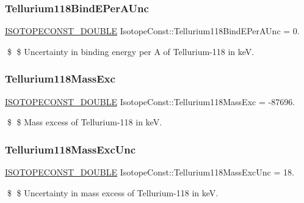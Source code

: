 \subsubsection{\texorpdfstring{Tellurium118\+Bind\+E\+Per\+A\+Unc}{Tellurium118BindEPerAUnc}}
{\footnotesize\ttfamily \mbox{\hyperlink{group___isotope_const-_macros_ga8f45a7272ce02c0b4c65c44636ed719a}{I\+S\+O\+T\+O\+P\+E\+C\+O\+N\+S\+T\+\_\+\+D\+O\+U\+B\+LE}} Isotope\+Const\+::\+Tellurium118\+Bind\+E\+Per\+A\+Unc = 0.}

\$ \$ Uncertainty in binding energy per A of Tellurium-\/118 in keV. \mbox{\label{group___isotope_const-_tellurium-_te118_gae98be884b7b64e0adf6f7be1048c6916}} 
\subsubsection{\texorpdfstring{Tellurium118\+Mass\+Exc}{Tellurium118MassExc}}
{\footnotesize\ttfamily \mbox{\hyperlink{group___isotope_const-_macros_ga8f45a7272ce02c0b4c65c44636ed719a}{I\+S\+O\+T\+O\+P\+E\+C\+O\+N\+S\+T\+\_\+\+D\+O\+U\+B\+LE}} Isotope\+Const\+::\+Tellurium118\+Mass\+Exc = -\/87696.}

\$ \$ Mass excess of Tellurium-\/118 in keV. \mbox{\label{group___isotope_const-_tellurium-_te118_ga4b823500be9c2b48e3f378dcfaf7af37}} 
\subsubsection{\texorpdfstring{Tellurium118\+Mass\+Exc\+Unc}{Tellurium118MassExcUnc}}
{\footnotesize\ttfamily \mbox{\hyperlink{group___isotope_const-_macros_ga8f45a7272ce02c0b4c65c44636ed719a}{I\+S\+O\+T\+O\+P\+E\+C\+O\+N\+S\+T\+\_\+\+D\+O\+U\+B\+LE}} Isotope\+Const\+::\+Tellurium118\+Mass\+Exc\+Unc = 18.}

\$ \$ Uncertainty in mass excess of Tellurium-\/118 in keV. \mbox{\label{group___isotope_const-_tellurium-_te118_ga904a1c768ec7ca4c111a96198513a9c6}} 
